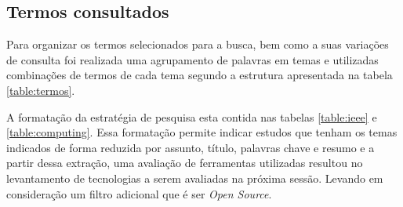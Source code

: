 \subsection{Termos consultados}
Para organizar os termos selecionados para a busca, bem como a suas variações de consulta foi realizada uma agrupamento de palavras em temas e utilizadas combinações de termos de cada tema segundo a estrutura apresentada na tabela \ref{table:termos}.

A formatação da estratégia de pesquisa esta contida nas tabelas \ref{table:ieee} e \ref{table:computing}. Essa formatação permite indicar estudos que tenham os temas indicados de forma reduzida por assunto, título, palavras chave e resumo e a partir dessa extração, uma avaliação de ferramentas utilizadas resultou no levantamento de tecnologias a serem avaliadas na próxima sessão. Levando em consideração um filtro adicional que é ser \emph{Open Source}.

